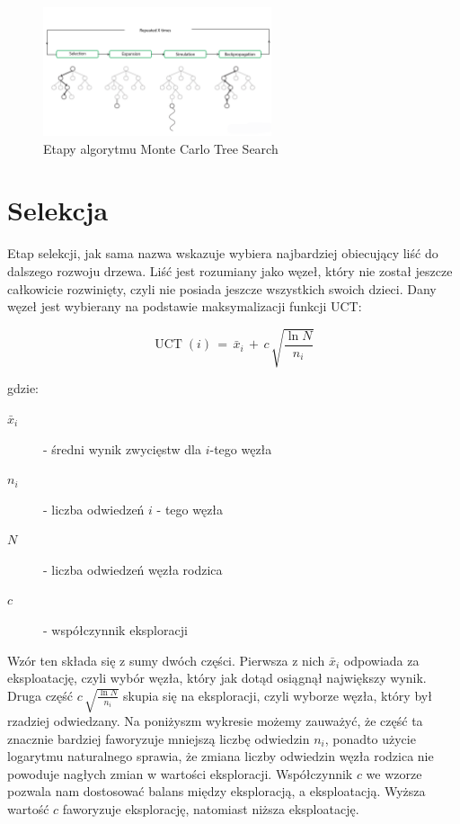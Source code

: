 \begin{figure}[!ht]
\centering
\includegraphics[width=0.6\textwidth]{images/mcts_sections.png}
\caption{Etapy algorytmu Monte Carlo Tree Search}
\end{figure}

\section{Selekcja}
Etap selekcji, jak sama nazwa wskazuje wybiera najbardziej obiecujący liść do dalszego rozwoju drzewa. Liść jest rozumiany jako węzeł, który nie został jeszcze całkowicie rozwinięty, czyli nie posiada jeszcze wszystkich swoich dzieci.
Dany węzeł jest wybierany na podstawie maksymalizacji funkcji UCT:

\begin{equation}
\operatorname{UCT}(i) \,=\, \bar{x}_i \, + \, c\, \sqrt{\frac{\ln N}{n_i}}\,
\end{equation}

\noindent gdzie:
\begin{description}
  \item[$\bar{x}_i$] - średni wynik zwycięstw dla $i$-tego węzła
  \item[$n_i$] - liczba odwiedzeń $i$ - tego węzła
  \item[$N$] - liczba odwiedzeń węzła rodzica
  \item[$c$] - współczynnik eksploracji
\end{description}

\hspace{1cm}

Wzór ten składa się z sumy dwóch części. Pierwsza z nich $\bar{x}_i$ odpowiada za eksploatację, czyli wybór węzła, który jak dotąd osiągnął największy wynik. Druga część $c\, \sqrt{\frac{\ln N}{n_i}}$ skupia się na eksploracji, czyli wyborze węzła, który był rzadziej odwiedzany. Na poniżyszm wykresie możemy zauważyć, że część ta znacznie bardziej faworyzuje mniejszą liczbę odwiedzin $n_i$, ponadto użycie logarytmu naturalnego sprawia, że zmiana liczby odwiedzin węzła rodzica nie powoduje nagłych zmian w wartości eksploracji. Współczynnik $c$ we wzorze pozwala nam dostosować balans między eksploracją, a eksploatacją. Wyższa wartość $c$ faworyzuje eksplorację, natomiast niższa eksploatację.

